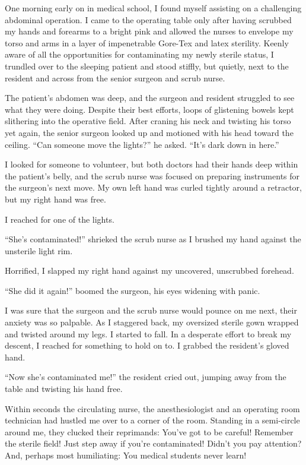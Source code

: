 ﻿\documentclass[12pt]{article}
\begin{document}
One morning early on in medical school, I found myself assisting on a challenging
abdominal\cite{abdominal} operation. I came to the operating table only after having scrubbed my
hands and forearms to a bright pink and allowed the nurses to envelope my torso\cite{torso} and arms
in a layer of impenetrable Gore-Tex and latex sterility. Keenly aware of all the opportunities for
contaminating my newly sterile status, I trundled over to the sleeping patient and stood stiffly,
but quietly, next to the resident and across from the senior surgeon and scrub nurse.

The patient's abdomen was deep, and the surgeon and resident struggled to see what they were doing.
Despite their best efforts, loops of glistening bowels kept slithering into the operative field.
After craning his neck and twisting his torso yet again, the senior surgeon looked up and motioned
with his head toward the ceiling. ``Can someone move the lights?'' he asked. ``It's dark down in
here.''

I looked for someone to volunteer, but both doctors had their hands deep within the patient's belly,
and the scrub nurse was focused on preparing instruments for the surgeon's next move. My own left
hand was curled tightly around a retractor, but my right hand was free.

I reached for one of the lights.

``She's contaminated!'' shrieked the scrub nurse as I brushed my hand against the unsterile light
rim.

Horrified, I slapped my right hand against my uncovered, unscrubbed forehead.

``She did it again!'' boomed the surgeon, his eyes widening with panic.

I was sure that the surgeon and the scrub nurse would pounce on me next, their anxiety was so
palpable. As I staggered back, my oversized sterile gown wrapped and twisted around my legs. I
started to fall. In a desperate effort to break my descent, I reached for something to hold on to. I
grabbed the resident's gloved hand.

``Now she's contaminated me!'' the resident cried out, jumping away from the table and twisting his
hand free.

Within seconds the circulating nurse, the anesthesiologist and an operating room technician had
hustled me over to a corner of the room. Standing in a semi-circle around me, they clucked their
reprimands: You've got to be careful! Remember the sterile field! Just step away if you're
contaminated! Didn't you pay attention? And, perhaps most humiliating: You medical students never
learn!
\end{document}
